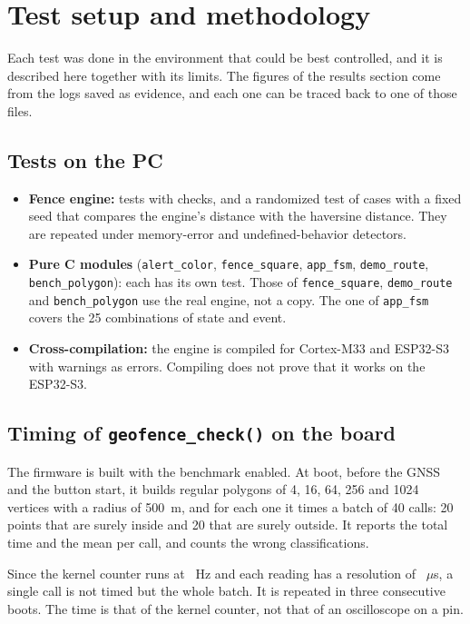 \section{Test setup and methodology}

Each test was done in the environment that could be best controlled, and it is described here together with
its limits. The figures of the results section come from the logs saved as evidence, and each one can be traced
back to one of those files.

\subsection{Tests on the PC}

\begin{itemize}
  \item \textbf{Fence engine:} \dHostTests{} tests with \dHostChecks{} checks, and a randomized test of
        \dStressCases{} cases with a fixed seed that compares the engine's distance with the haversine distance.
        They are repeated under memory-error and undefined-behavior detectors.
  \item \textbf{Pure C modules} (\texttt{alert\_color}, \texttt{fence\_square}, \texttt{app\_fsm},
        \texttt{demo\_route}, \texttt{bench\_polygon}): each has its own test. Those of \texttt{fence\_square},
        \texttt{demo\_route} and \texttt{bench\_polygon} use the real engine, not a copy. The one of
        \texttt{app\_fsm} covers the 25 combinations of state and event.
  \item \textbf{Cross-compilation:} the engine is compiled for Cortex-M33 and ESP32-S3 with warnings as
        errors. Compiling does not prove that it works on the ESP32-S3.
\end{itemize}

\subsection{Timing of \texttt{geofence\_check()} on the board}

The firmware is built with the benchmark enabled. At boot, before the GNSS and the button start, it builds
regular polygons of 4, 16, 64, 256 and 1024 vertices with a radius of 500~m, and for each one it times a batch
of 40 calls: 20 points that are surely inside and 20 that are surely outside. It reports the total time and
the mean per call, and counts the wrong classifications.

Since the kernel counter runs at \dClockHz~Hz and each reading has a resolution of \dTickUs~$\mu$s, a single
call is not timed but the whole batch. It is repeated in three consecutive boots. The time is that of the
kernel counter, not that of an oscilloscope on a pin.

